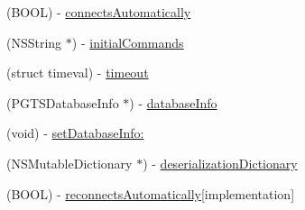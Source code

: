 {\bf }\par
\begin{DoxyCompactItemize}
\item 
(B\+O\+O\+L) -\/ \hyperlink{category_p_g_t_s_connection_07_misc_accessors_08_ac0cfd676770b4b40685b599acd2da740}{connects\+Automatically}
\end{DoxyCompactItemize}

{\bf }\par
\begin{DoxyCompactItemize}
\item 
(N\+S\+String $\ast$) -\/ \hyperlink{category_p_g_t_s_connection_07_misc_accessors_08_a730509f6710de6bca942950a0075b209}{initial\+Commands}
\end{DoxyCompactItemize}

{\bf }\par
\begin{DoxyCompactItemize}
\item 
(struct timeval) -\/ \hyperlink{category_p_g_t_s_connection_07_misc_accessors_08_ac337237c5b175d6107048ab770106533}{timeout}
\end{DoxyCompactItemize}

{\bf }\par
\begin{DoxyCompactItemize}
\item 
(P\+G\+T\+S\+Database\+Info $\ast$) -\/ \hyperlink{category_p_g_t_s_connection_07_misc_accessors_08_a77f4acfa420b3effffa51aff48d881d7}{database\+Info}
\item 
(void) -\/ \hyperlink{category_p_g_t_s_connection_07_misc_accessors_08_abffc8fbb7c1b51a6fff0e52673589671}{set\+Database\+Info\+:}
\end{DoxyCompactItemize}

{\bf }\par
\begin{DoxyCompactItemize}
\item 
(N\+S\+Mutable\+Dictionary $\ast$) -\/ \hyperlink{category_p_g_t_s_connection_07_misc_accessors_08_acc24bbfabac6c53c4997b03bd746e4a9}{deserialization\+Dictionary}
\end{DoxyCompactItemize}

{\bf }\par
\begin{DoxyCompactItemize}
\item 
(B\+O\+O\+L) -\/ \hyperlink{category_p_g_t_s_connection_07_misc_accessors_08_abbc8c5d8c7f6656395e2a7d261f4e1ac}{reconnects\+Automatically}{\ttfamily  \mbox{[}implementation\mbox{]}}
\end{DoxyCompactItemize}

